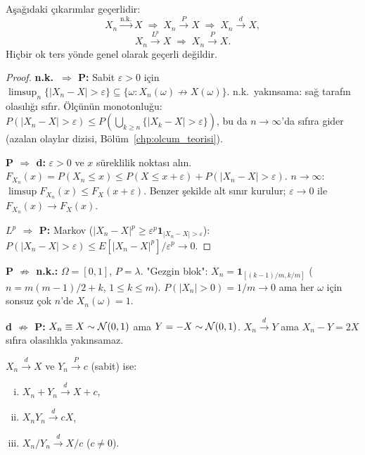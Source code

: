 \begin{teorem}
\label{thm:yaklinsama_hiyerarsi}
Aşağıdaki çıkarımlar geçerlidir:
\[
  X_n \xrightarrow{\text{n.k.}} X \;\Rightarrow\; X_n \xrightarrow{P} X \;\Rightarrow\; X_n \xrightarrow{d} X,
\]
\[
  X_n \xrightarrow{L^p} X \;\Rightarrow\; X_n \xrightarrow{P} X.
\]
Hiçbir ok ters yönde genel olarak geçerli değildir.
\end{teorem}

\begin{proof}
\textbf{n.k.\ $\Rightarrow$ P:} Sabit $\varepsilon > 0$ için
$\limsup_n \{|X_n - X| > \varepsilon\} \subseteq \{\omega : X_n(\omega) \not\to X(\omega)\}$.
n.k.\ yakınsama: sağ tarafın olasılığı sıfır. Ölçünün monotonluğu:
$P(|X_n-X| > \varepsilon) \leq P(\bigcup_{k\geq n}\{|X_k-X|>\varepsilon\})$,
bu da $n\to\infty$'da sıfıra gider (azalan olaylar dizisi, Bölüm~\ref{chp:olcum_teorisi}).

\textbf{P $\Rightarrow$ d:} $\varepsilon > 0$ ve $x$ süreklilik noktası alın.
$F_{X_n}(x) = P(X_n \leq x) \leq P(X \leq x+\varepsilon) + P(|X_n - X| > \varepsilon)$.
$n\to\infty$: $\limsup F_{X_n}(x) \leq F_X(x+\varepsilon)$.
Benzer şekilde alt sınır kurulur; $\varepsilon\to 0$ ile $F_{X_n}(x) \to F_X(x)$.

\textbf{$L^p$ $\Rightarrow$ P:} Markov ($|X_n-X|^p \geq \varepsilon^p \mathbf{1}_{|X_n-X|>\varepsilon}$):
$P(|X_n-X|>\varepsilon) \leq E[|X_n-X|^p]/\varepsilon^p \to 0$.
\end{proof}

\begin{karsiornek}
\label{ex:yaklinsama_karsiornek}

\textbf{P $\not\Rightarrow$ n.k.:} $\Omega = [0,1]$, $P = \lambda$. "Gezgin blok":
$X_n = \mathbf{1}_{[(k-1)/m, k/m]}$ ($n = m(m-1)/2 + k$, $1 \leq k \leq m$).
$P(|X_n| > 0) = 1/m \to 0$ ama her $\omega$ için sonsuz çok $n$'de $X_n(\omega) = 1$.

\textbf{d $\not\Rightarrow$ P:} $X_n \equiv X \sim \mathcal{N}(0,1)$ ama $Y = -X \sim \mathcal{N}(0,1)$.
$X_n \xrightarrow{d} Y$ ama $X_n - Y = 2X$ sıfıra olasılıkla yakınsamaz.
\end{karsiornek}

\begin{teorem}
\label{thm:slutsky}
$X_n \xrightarrow{d} X$ ve $Y_n \xrightarrow{P} c$ (sabit) ise:
\begin{enumerate}[(i)]
  \item $X_n + Y_n \xrightarrow{d} X + c$,
  \item $X_n Y_n \xrightarrow{d} cX$,
  \item $X_n / Y_n \xrightarrow{d} X/c$ ($c \neq 0$).
\end{enumerate}
\end{teorem}

